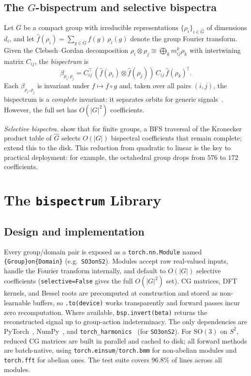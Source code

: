 \documentclass{article}
\theoremstyle{definition}
\theoremstyle{remark}
\newcommand{\SO}{\mathrm{SO}}
\theoremstyle{definition}
\begin{document}
\subsection{The $G$-bispectrum and selective bispectra}

Let $G$ be a compact group with irreducible representations
$\{\rho_i\}_{i \in \hat{G}}$ of dimensions $d_i$, and let
$\hat{f}(\rho_i) = \sum_{g \in G} f(g)\, \rho_i(g)$ denote the group
Fourier transform. Given the Clebsch--Gordan decomposition
$\rho_i \otimes \rho_j \cong \bigoplus_k m_{ij}^k \rho_k$ with
intertwining matrix $C_{ij}$, the \emph{bispectrum} is
\begin{equation}
  \label{eq:bispectrum-def}
  \beta_{\rho_i, \rho_j}
    = C_{ij}^\top\,
      (\hat{f}(\rho_i) \otimes \hat{f}(\rho_j))\,
      C_{ij}\, \hat{f}(\rho_k)^\dagger.
\end{equation}
Each $\beta_{\rho_i,\rho_j}$ is invariant under $f \mapsto f \circ g$ and,
taken over all pairs $(i,j)$, the bispectrum is a \emph{complete} invariant:
it separates orbits for generic signals~\citep{kakarala2012bispectrum}. However,
the full set has $O(|G|^2)$ coefficients.

\emph{Selective bispectra.} \citet{mataigne2024selective} show that for
finite groups, a BFS traversal of the Kronecker product table of $\hat{G}$
selects $O(|G|)$ bispectral coefficients that remain complete;
\citet{myers2025selective} extend this to the disk. This
reduction from quadratic to linear is the key to practical deployment:
for example, the octahedral group drops from $576$ to $172$ coefficients.

\section{The \texttt{bispectrum} Library}
\label{sec:library}

\subsection{Design and implementation}
\label{sec:design}

Every group/domain pair is exposed as a \texttt{torch.nn.Module}
named \texttt{\{Group\}on\{Domain\}} (e.g.\ \texttt{SO3onS2}).
Modules accept raw real-valued inputs, handle the Fourier transform
internally, and default to $O(|G|)$ selective coefficients
(\texttt{selective=False} gives the full $O(|G|^2)$ set).
CG matrices, DFT kernels, and Bessel roots are precomputed at
construction and stored as non-learnable buffers, so
\texttt{.to(device)} works transparently and forward passes incur zero
recomputation.
Where available, \texttt{bsp.invert(beta)} returns the reconstructed
signal up to group-action indeterminacy.
The only dependencies are PyTorch~\citep{paszke2019pytorch},
NumPy~\citep{harris2020numpy}, and
\texttt{torch\_harmonics}~\citep{bonev2023spherical}
(for \texttt{SO3onS2}).
For $\SO(3)$ on $S^2$, reduced CG matrices are built in parallel and
cached to disk; all forward methods are batch-native, using
\texttt{torch.einsum}/\texttt{torch.bmm} for non-abelian modules and
\texttt{torch.fft} for abelian ones.
The test suite covers 96.8\% of lines across all modules.
\end{document}
